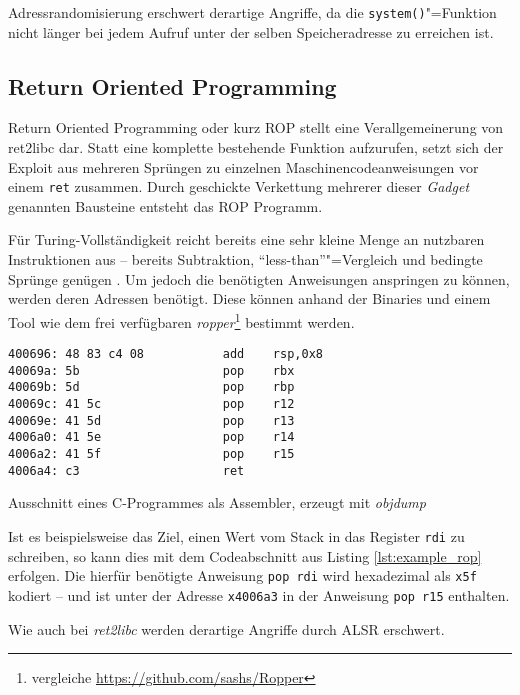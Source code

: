 Adressrandomisierung erschwert derartige Angriffe, da die \texttt{system()}"=Funktion nicht länger bei jedem Aufruf unter der selben Speicheradresse zu erreichen ist.

\subsection{Return Oriented Programming}

Return Oriented Programming oder kurz ROP stellt eine Verallgemeinerung von ret2libc dar. Statt eine komplette bestehende Funktion aufzurufen, setzt sich der Exploit aus mehreren Sprüngen zu einzelnen Maschinencodeanweisungen vor einem \texttt{ret} zusammen. Durch geschickte Verkettung mehrerer dieser \emph{Gadget} genannten Bausteine entsteht das ROP Programm.

Für Turing-Vollständigkeit reicht bereits eine sehr kleine Menge an nutzbaren Instruktionen aus -- bereits Subtraktion, \enquote{less-than}"=Vergleich und bedingte Sprünge genügen \cite[S.3]{Homescu.2012}. Um jedoch die benötigten Anweisungen anspringen zu können, werden deren Adressen benötigt. Diese können anhand der Binaries und einem Tool wie dem frei verfügbaren \emph{ropper}\footnote{vergleiche \url{https://github.com/sashs/Ropper}} bestimmt werden.

\begin{listing}[ht]
\begin{verbatim}
400696: 48 83 c4 08           add    rsp,0x8
40069a: 5b                    pop    rbx
40069b: 5d                    pop    rbp
40069c: 41 5c                 pop    r12
40069e: 41 5d                 pop    r13
4006a0: 41 5e                 pop    r14
4006a2: 41 5f                 pop    r15
4006a4: c3                    ret
\end{verbatim}
\caption{Ausschnitt eines C-Programmes als Assembler, erzeugt mit \emph{objdump}}
\label{lst:example_rop}
\end{listing}

Ist es beispielsweise das Ziel, einen Wert vom Stack in das Register \texttt{rdi} zu schreiben, so kann dies mit dem Codeabschnitt aus Listing \ref{lst:example_rop} erfolgen. Die hierfür benötigte Anweisung \texttt{pop rdi} wird hexadezimal als \texttt{x5f} kodiert -- und ist unter der Adresse \texttt{x4006a3} in der Anweisung \texttt{pop r15} enthalten.

Wie auch bei \emph{ret2libc} werden derartige Angriffe durch ALSR erschwert.

